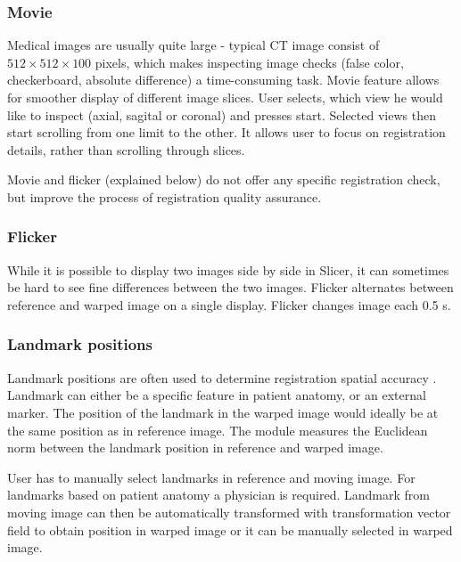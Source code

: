 \documentclass[type=dr, dr=rernat, accentcolor=tud7b,colorbacktitle, bigchapter, openright, twoside, 12pt ]{tudthesis}
\begin{document}
\subsubsection{Movie}

Medical images are usually quite large - typical CT image consist of $512 \times 512 \times 100$ pixels, which makes inspecting image checks (false color, checkerboard, absolute difference) a time-consuming task. Movie feature allows for smoother display of different image slices. User selects, which view he would like to inspect (axial, sagital or coronal) and presses start. Selected views then start scrolling from one limit to the other. It allows user to focus on registration details, rather than scrolling through slices.

Movie and flicker (explained below) do not offer any specific registration check, but improve the process of registration quality assurance.

\subsubsection{Flicker}

While it is possible to display two images side by side in Slicer, it can sometimes be hard to see fine differences between the two images. Flicker alternates between reference and warped image on a single display. Flicker changes image each 0.5 s.

\subsubsection{Landmark positions}

Landmark positions are often used to determine registration spatial accuracy \cite{Castillo2009}. Landmark can either be a specific feature in patient anatomy, or an external marker. The position of the landmark in the warped image would ideally be at the same position as in reference image. The module measures the Euclidean norm between the landmark position in reference and warped image.

User has to manually select landmarks in reference and moving image. For landmarks based on patient anatomy a physician is required. Landmark from moving image can then be automatically transformed with transformation vector field to obtain position in warped image or it can be manually selected in warped image.
\end{document}
